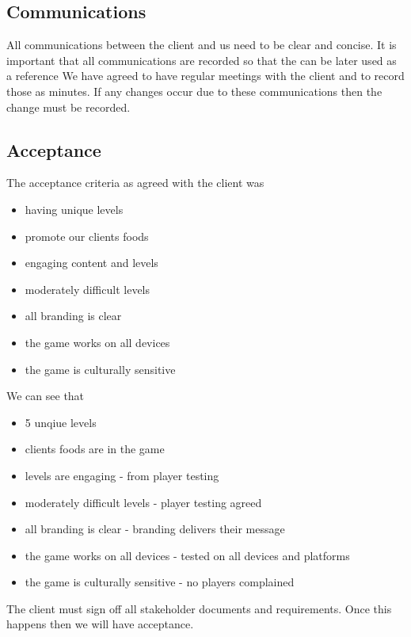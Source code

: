 \documentclass{article}
\begin{document}
\subsection{Communications}
All communications between the client and us need to be clear and concise.
It is important that all communications are recorded so that the can be later used as a reference
We have agreed to have regular meetings with the client and to record those as minutes.
If any changes occur due to these communications then the change must be recorded.

\subsection{Acceptance}

The acceptance criteria as agreed with the client was
\begin{itemize}
    \item having unique levels
    \item promote our clients foods 
    \item engaging content and levels
    \item moderately difficult levels
    \item all branding is clear
    \item the game works on all devices
    \item the game is culturally sensitive
\end{itemize}

We can see that
\begin{itemize}
    \item 5 unqiue levels
    \item clients foods are in the game 
    \item levels are engaging - from player testing
    \item moderately difficult levels - player testing agreed
    \item all branding is clear - branding delivers their message
    \item the game works on all devices - tested on all devices and platforms
    \item the game is culturally sensitive - no players complained
\end{itemize}

The client must sign off all stakeholder documents and requirements.
Once this happens then we will have acceptance.
\end{document}
